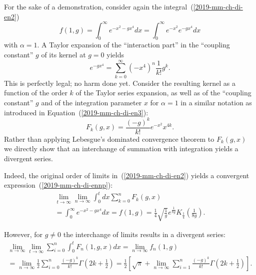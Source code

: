 For the sake of a demonstration, consider again the integral~(\ref{2019-mm-ch-di-en2})
\begin{equation}
f\left(1,g\right)
=\int_{0}^{\infty}e^{- x^{2}-gx^{4}}dx
=\int_{0}^{\infty}e^{- x^{2}}e^{-gx^{4}}dx
\label{2019-mm-ch-di-en3a}
\end{equation}
with $\alpha=1$. A Taylor expansion of the ``interaction part'' in the ``coupling constant'' $g$
of its kernel at $g=0$ yields
\begin{equation}
e^{-gx^{4}} =\sum_{k=0}^\infty \left(-x^4\right)^n \frac{1}{k!} g^k.
\label{2019-mm-ch-di-en3eip}
\end{equation}
This is perfectly legal; no harm done yet.
Consider the resulting kernel as a function of  the order $k$
of the Taylor series expansion, as well as of the ``coupling constant'' $g$
 and of the integration parameter $x$
for $\alpha=1$ in a similar notation as introduced in Equation~(\ref{2019-mm-ch-di-en3}):
\begin{equation}
F_k(g,x)= \frac{\left(-g\right)^k}{k!} e^{- x^{2}} x^{4k} .
\label{2019-mm-ch-di-en3eipke}
\end{equation}
Rather than  applying Lebesgue's dominated convergence theorem to $F_k(g,x)$
we directly show that an interchange of summation with integration yields a divergent series.


Indeed, the original order of limits in~(\ref{2019-mm-ch-di-en2})
yields a convergent expression~(\ref{2019-mm-ch-di-ennp}):
\begin{equation}
\begin{split}
\lim_{t\rightarrow \infty}
\lim_{n\rightarrow \infty}
\int_0^t dx
\sum_{k=0}^n
F_k(g,x) \qquad \qquad \\
=
\int_{0}^{\infty}e^{-x^{2}-gx^{4}}dx  = f\left(1,g\right)=
\frac{1}{4}\sqrt{\frac{1}{g}}e^{\frac{1}{8g}}K_{\frac{1}{4}}\left(\frac{1}{8g}\right)
.
\label{2019-mm-ch-di-en3eipke2c1}
\end{split}
\end{equation}

However, for $g\neq 0$ the interchange of limits results in a divergent series:
\begin{equation}
\begin{split}
\lim_{n\rightarrow \infty}
\lim_{t\rightarrow \infty}
\sum_{i=0}^n
\int_0^t
F_n(1,g,x)   dx =
\lim_{n\rightarrow \infty}
  f_n\left(1,g\right)   \\
=\lim_{n\rightarrow \infty}
\frac{1}{2}
\sum_{i=0}^n
\frac{(-g)^k}{k!} \Gamma\left(2k+\frac{1}{2}\right)
=
\frac{1}{2}\left[
\sqrt{\pi}
+
\lim_{n\rightarrow \infty}\sum_{i=1}^n
\frac{(-g)^k}{k!} \Gamma\left(2k+\frac{1}{2}\right)
\right].
\label{2019-mm-ch-di-en3eipke2c2}
\end{split}
\end{equation}

